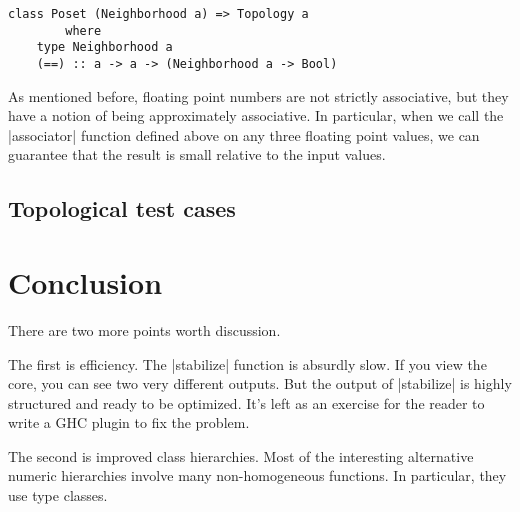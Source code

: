 \documentclass[preprint]{sigplanconf}
\theoremstyle{definition}
\begin{document}
\begin{lstlisting}
class Poset (Neighborhood a) => Topology a
        where
    type Neighborhood a
    (==) :: a -> a -> (Neighborhood a -> Bool)
\end{lstlisting}

As mentioned before, floating point numbers are not strictly associative,
but they have a notion of being approximately associative.
In particular, when we call the |associator| function defined above on any three floating point values,
we can guarantee that the result is small relative to the input values.

\subsection{Topological test cases}

\section{Conclusion}

There are two more points worth discussion.

The first is efficiency.
The |stabilize| function is absurdly slow.
If you view the core, you can see two very different outputs.
But the output of |stabilize| is highly structured and ready to be optimized.
It's left as an exercise for the reader to write a GHC plugin to fix the problem.

The second is improved class hierarchies.
Most of the interesting alternative numeric hierarchies involve many non-homogeneous functions.
In particular, they use type classes.



%
%
%
%




\end{document}
